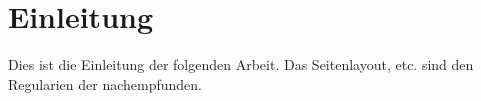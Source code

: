 \section{Einleitung}

Dies ist die Einleitung der folgenden Arbeit. Das Seitenlayout, etc. sind den Regularien der \textcite{arbeitsstellefurpolitischesoziologiederbundesrepublikdeutschlandamottosuhrinstitutderfreienuniversitatberlinHandreichungVerfassenHaus2019} nachempfunden.

\blindtext